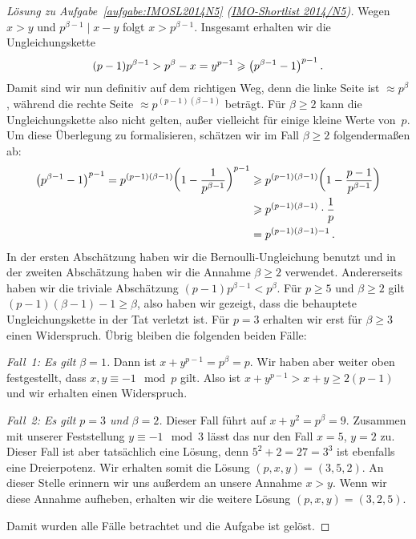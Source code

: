 \begin{proof}[Lösung zu Aufgabe~\ref{aufgabe:IMOSL2014N5} \textmd{(\href{https://artofproblemsolving.com/community/c107000_2014_imo_shortlist}{IMO-Shortlist 2014/N5})}]
	Wegen $x>y$ und $p^{\beta-1}\mid x-y$ folgt $x>p^{\beta-1}$. Insgesamt erhalten wir die Ungleichungskette
	\begin{equation*}
		(p-1)p^{\beta-1}>p^\beta-x =y^{p-1}\geqslant \parens*{p^{\beta-1}-1}^{p-1}\,.
	\end{equation*}
	Damit sind wir nun definitiv auf dem richtigen Weg, denn die linke Seite ist $\approx p^\beta$, während die rechte Seite $\approx p^{(p-1)(\beta-1)}$ beträgt. Für $\beta\geqslant 2$ kann die Ungleichungskette also nicht gelten, außer vielleicht für einige kleine Werte von~$p$. Um diese Überlegung zu formalisieren, schätzen wir im Fall $\beta\geqslant 2$ folgendermaßen ab:
	\begin{align*}
		\parens*{p^{\beta-1}-1}^{p-1}=p^{(p-1)(\beta-1)}\parens*{1-\frac{1}{p^{\beta-1}}}^{p-1}&\geqslant p^{(p-1)(\beta-1)}\parens*{1-\frac{p-1}{p^{\beta-1}}}\\
		&\geqslant p^{(p-1)(\beta-1)}\cdot \frac 1p\\
		&=p^{(p-1)(\beta-1)-1}\,.
	\end{align*}
	In der ersten Abschätzung haben wir die Bernoulli-Ungleichung benutzt und in der zweiten Abschätzung haben wir die Annahme $\beta\geqslant 2$ verwendet. Andererseits haben wir die triviale Abschätzung $(p-1)p^{\beta-1}<p^\beta$. Für $p\geqslant 5$ und $\beta\geqslant 2$ gilt $(p-1)(\beta-1)-1\geqslant \beta$, also haben wir gezeigt, dass die behauptete Ungleichungskette in der Tat verletzt ist. Für $p=3$ erhalten wir erst für $\beta\geqslant 3$ einen Widerspruch. Übrig bleiben die folgenden beiden Fälle:
	
	\emph{Fall~1: Es gilt $\beta=1$.} Dann ist $x+y^{p-1}=p^\beta=p$. Wir haben aber weiter oben festgestellt, dass $x,y\equiv -1\mod p$ gilt. Also ist $x+y^{p-1}>x+y\geqslant 2(p-1)$ und wir erhalten einen Widerspruch.
	
	\emph{Fall~2: Es gilt $p=3$ und $\beta=2$.} Dieser Fall führt auf $x+y^2=p^\beta=9$. Zusammen mit unserer Feststellung $y\equiv -1\mod 3$ lässt das nur den Fall $x=5$, $y=2$ zu. Dieser Fall ist aber tatsächlich eine Lösung, denn $5^2+2=27=3^3$ ist ebenfalls eine Dreierpotenz. Wir erhalten somit die Lösung $(p,x,y)=(3,5,2)$. An dieser Stelle erinnern wir uns außerdem an unsere Annahme $x>y$. Wenn wir diese Annahme aufheben, erhalten wir die weitere Lösung $(p,x,y)=(3,2,5)$.
	
	Damit wurden alle Fälle betrachtet und die Aufgabe ist gelöst.
\end{proof}